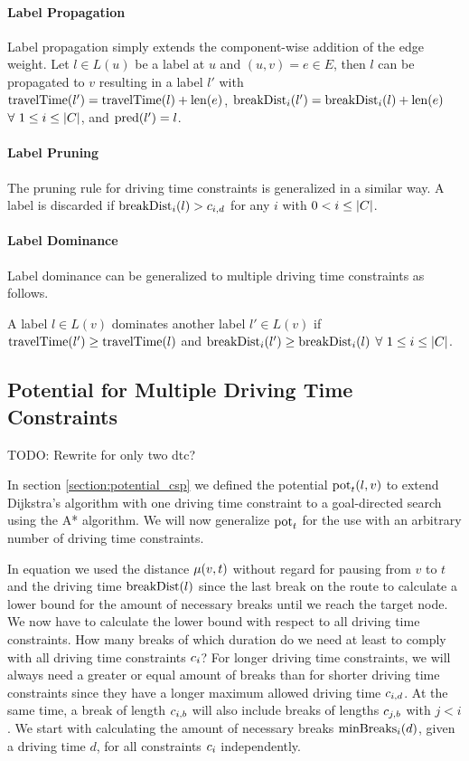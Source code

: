 \paragraph{Label Propagation}
Label propagation simply extends the component-wise addition of the edge weight. Let $l \in L(u)$ be a label at $u$ and $(u,v) = e \in E$, then $l$ can be propagated to $v$ resulting in a label $l'$ with $\operatorname{travelTime}(l') = \operatorname{travelTime}(l) + \operatorname{len}(e)$, $\operatorname{breakDist}_i(l') = \operatorname{breakDist}_i(l) + \operatorname{len}(e)$ $\forall\ 1 \le i \le |C|$, and $\operatorname{pred}(l') = l$.

\paragraph{Label Pruning}
The pruning rule for driving time constraints is generalized in a similar way. A label is discarded if $\operatorname{breakDist}_i(l) > c_{i,d}$ for any $i$ with $0 < i \le |C|$.


\paragraph{Label Dominance}
Label dominance can be generalized to multiple driving time constraints as follows.

\begin{definition}
	A label $l \in L(v)$ dominates another label $l' \in L(v)$ if $\operatorname{travelTime}(l') \ge \operatorname{travelTime}(l)$ and $\operatorname{breakDist}_i(l') \ge \operatorname{breakDist}_i(l)$ $\forall\ 1 \le i \le |C|$.
\end{definition}

\subsection{Potential for Multiple Driving Time Constraints\label{section:potential_n_csp}}
TODO: Rewrite for only two dtc?

In section \ref{section:potential_csp} we defined the potential $\operatorname{pot}_t(l,v)$ to extend Dijkstra's algorithm with one driving time constraint to a goal-directed search using the A* algorithm. We will now generalize $\operatorname{pot}_t$ for the use with an arbitrary number of driving time constraints.

In equation  we used the distance $\mu(v,t)$ without regard for pausing from $v$ to $t$ and the driving time $\operatorname{breakDist}(l)$ since the last break on the route to calculate a lower bound for the amount of necessary breaks until we reach the target node. We now have to calculate the lower bound with respect to all driving time constraints. How many breaks of which duration do we need at least to comply with all driving time constraints $c_i$? For longer driving time constraints, we will always need a greater or equal amount of breaks than for shorter driving time constraints since they have a longer maximum allowed driving time $c_{i,d}$. At the same time, a break of length $c_{i,b}$ will also include breaks of lengths $c_{j,b}$ with $j < i$. We start with calculating the amount of necessary breaks $\operatorname{minBreaks}_i(d)$, given a driving time $d$, for all constraints $c_i$ independently.


